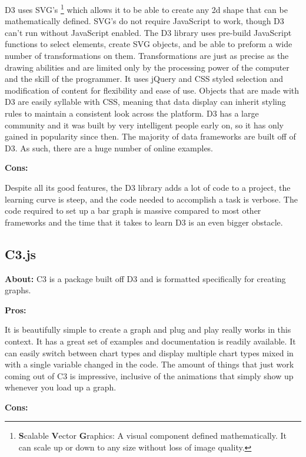 \documentclass[draftclsnofoot,onecolumn,letterpaper,10pt,compsoc]{IEEEtran}
\begin{document}
  D3 uses SVG's \footnote{\textbf{S}calable \textbf{V}ector \textbf{G}raphics: A visual component defined mathematically. It can scale up or down to any size without loss of image quality.} which allows it to be able to create any 2d shape that can be mathematically defined.
  SVG's do not require JavaScript to work, though D3 can't run without JavaScript enabled.
  The D3 library uses pre-build JavaScript functions to select elements, create SVG objects, and be able to preform a wide number of transformations on them.\cite{d3.org}
  Transformations are just as precise as the drawing abilities and are limited only by the processing power of the computer and the skill of the programmer.
  It uses jQuery and CSS styled selection and modification of content for flexibility and ease of use.
  Objects that are made with D3 are easily syllable with CSS, meaning that data display can inherit styling rules to maintain a consistent look across the platform.
  D3 has a large community and it was built by very intelligent people early on, so it has only gained in popularity since then.\cite{DataVisProCon}
  The majority of data frameworks are built off of D3.
  As such, there are a huge number of online examples.

  \textbf{Cons:}

  Despite all its good features, the D3 library adds a lot of code to a project, the learning curve is steep, and the code needed to accomplish a task is verbose.\cite{DataVisProCon}
  The code required to set up a bar graph is massive compared to most other frameworks and the time that it takes to learn D3 is an even bigger obstacle.

  \subsection{C3.js}
  \textbf{About:}
  C3 is a package built off D3 and is formatted specifically for creating graphs.

  \textbf{Pros:}

  It is beautifully simple to create a graph and plug and play really works in this context.
  It has a great set of examples and documentation is readily available.
  It can easily switch between chart types and display multiple chart types mixed in with a single variable changed in the code.\cite{c3.org}
  The amount of things that just work coming out of C3 is impressive, inclusive of the animations that simply show up whenever you load up a graph.

  \textbf{Cons:}
\end{document}
